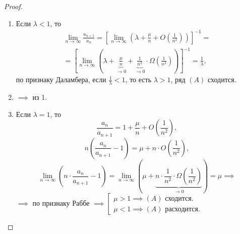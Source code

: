 \begin{proof}\leavevmode
    \begin{enumerate}
        \item Если $\lambda < 1$, то
              \begin{multline*}
                  \underset{n\rightarrow\infty}{\lim} \frac{a_{n+1}}{a_n} = \left[\underset{n\rightarrow\infty}{\lim}\left(\lambda + \frac{\mu}{n} + O\left(\frac{1}{n^2}\right)\right)\right]^{-1} = \\
                  = \left[\underset{n\rightarrow\infty}{\lim}\left(\lambda + \underbrace{\frac{\mu}{n}}_{\rightarrow 0} + \underbrace{\frac{1}{n^2}}_{\rightarrow 0} \cdot \Omega\left(\frac{1}{n^2}\right)\right)\right]^{-1} = \frac{1}{\lambda},
              \end{multline*}
              по признаку Даламбера, если $\frac{1}{\lambda} < 1$, то есть $\lambda > 1$, ряд $(A)$ сходится.

        \item $ \implies $ из 1.

        \item Если $\lambda = 1$, то
              \[
                  \frac{a_n}{a_{n+1}} = 1 + \frac{\mu}{n} + O\left(\frac{1}{n^2}\right),
              \]
              \[
                  n\left(\frac{a_n}{a_{n+1}} - 1\right) = \mu + n \cdot O\left(\frac{1}{n^2}\right),
              \]
              \[
                  \underset{n\rightarrow\infty}{\lim}\left(n\cdot \frac{a_n}{a_{n+1}} - 1\right) = \underset{n\rightarrow\infty}{\lim}\left(\mu + \underbrace{n \cdot \frac{1}{n^2} \cdot \Omega (\frac{1}{n^2})}_{\rightarrow 0}\right) = \mu \implies
              \]
              $\implies$ по признаку Раббе $\implies \left[\begin{array}{l}
                      \mu > 1 \implies (A) \text{ сходится.} \\
                      \mu < 1 \implies (A) \text{ расходится.}
                  \end{array} \right.$


\end{enumerate}
\end{proof}
